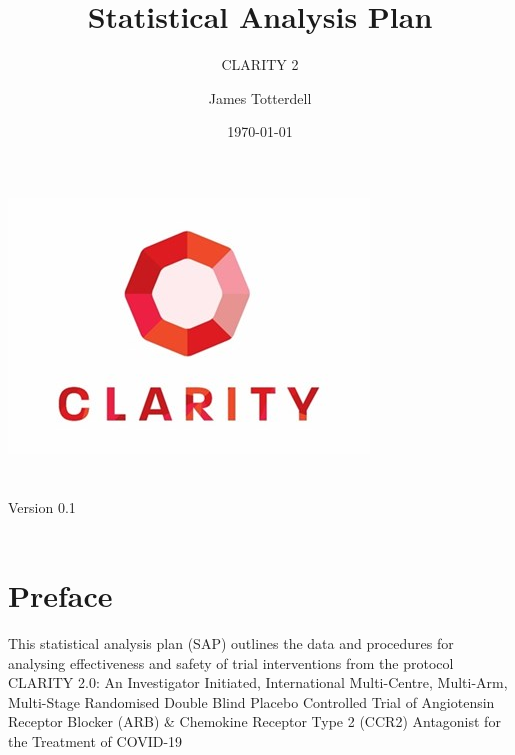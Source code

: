 \documentclass[11pt,parskip=half-]{scrartcl}
\begin{document}
\title{Statistical Analysis Plan}
\subtitle{CLARITY 2}
\author{James Totterdell}
\date{\today}
\makeatletter
\begin{titlepage}
    \begin{center}
        \includegraphics[width=0.7\linewidth]{clarity-logo.jpg}\\[4ex]
        {\huge \bfseries  \@title }\\[2ex]
        {\LARGE \bfseries  \@subtitle }\\[2ex]
        {\large Version 0.1}\\[2ex]
        {\large \@date}\\[10ex]
    \end{center}
\end{titlepage}
\makeatother
\thispagestyle{empty}
\newpage

\tableofcontents

\clearpage

\section*{Preface}

This statistical analysis plan (SAP) outlines the data and procedures for analysing effectiveness and safety of trial interventions from the protocol CLARITY 2.0: An Investigator Initiated, International Multi-Centre, Multi-Arm, Multi-Stage Randomised Double Blind Placebo Controlled Trial of Angiotensin Receptor Blocker (ARB) \& Chemokine Receptor Type 2 (CCR2) Antagonist for the Treatment of COVID-19
\end{document}
